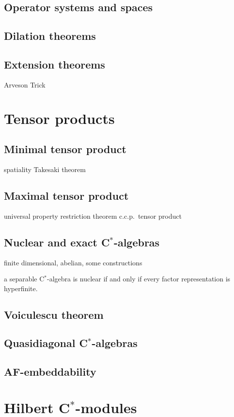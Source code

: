 \documentclass{../../large}
\begin{document}
\section{Operator systems and spaces}
\section{Dilation theorems}
\section{Extension theorems}
Arveson
Trick




\chapter{Tensor products}
\section{Minimal tensor product}
spatiality
Takesaki theorem

\section{Maximal tensor product}
universal property
restriction theorem
c.c.p.~tensor product

\section{Nuclear and exact C$^*$-algebras}
finite dimensional, abelian, some constructions




a separable C$^*$-algebra is nuclear if and only if every factor representation is hyperfinite.



\section{Voiculescu theorem}
\section{Quasidiagonal C$^*$-algebras}
\section{AF-embeddability}



\chapter{Hilbert C$^*$-modules}
\end{document}
